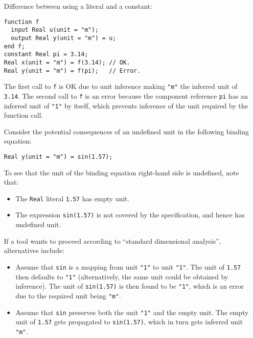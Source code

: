 \begin{example}
Difference between using a literal and a constant:
\begin{lstlisting}[language=modelica]
function f
  input Real u(unit = "m");
  output Real y(unit = "m") = u;
end f;
constant Real pi = 3.14;
Real x(unit = "m") = f(3.14); // OK.
Real y(unit = "m") = f(pi);   // Error.
\end{lstlisting}
The first call to \lstinline!f! is OK due to unit inference making \lstinline!"m"! the inferred unit of \lstinline!3.14!.
The second call to \lstinline!f! is an error because the component reference \lstinline!pi! has an inferred unit of \lstinline!"1"! by itself, which prevents inference of the unit required by the function call.
\end{example}

\begin{example}
Consider the potential consequences of an undefined unit in the following binding equation:
\begin{lstlisting}[language=modelica]
Real y(unit = "m") = sin(1.57);
\end{lstlisting}
To see that the unit of the binding equation right-hand side is undefined, note that:
\begin{itemize}
\item The \lstinline!Real! literal \lstinline!1.57! has empty unit.
\item The expression \lstinline!sin(1.57)! is not covered by the specification, and hence has undefined unit.
\end{itemize}
If a tool wants to proceed according to ``standard dimensional analysis'', alternatives include:
\begin{itemize}
\item
  Assume that \lstinline!sin! is a mapping from unit \lstinline!"1"! to unit \lstinline!"1"!.
  The unit of \lstinline!1.57! then defaults to \lstinline!"1"! (alternatively, the same unit could be obtained by inference).
  The unit of \lstinline!sin(1.57)! is then found to be \lstinline!"1"!, which is an error due to the required unit being \lstinline!"m"!.
\item
  Assume that \lstinline!sin! preserves both the unit \lstinline!"1"! and the empty unit.
  The empty unit of \lstinline!1.57! gets propagated to \lstinline!sin(1.57)!, which in turn gets inferred unit \lstinline!"m"!.
\end{itemize}
\end{example}
